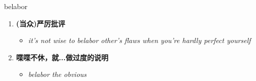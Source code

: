 
\begin{frame}
{\huge belabor}
\begin{center}
\begin{enumerate}\Large
  \item \textbf{(当众)严厉批评}
  \begin{itemize}
    \item \em{\Large{it's not wise to belabor other's flaws when you're hardly perfect yourself}}
  \end{itemize}
  \item \textbf{喋喋不休，就...做过度的说明}
  \begin{itemize}
    \item \em{\Large{belabor the obvious}}
  \end{itemize}
\end{enumerate}
\end{center}
\end{frame}
